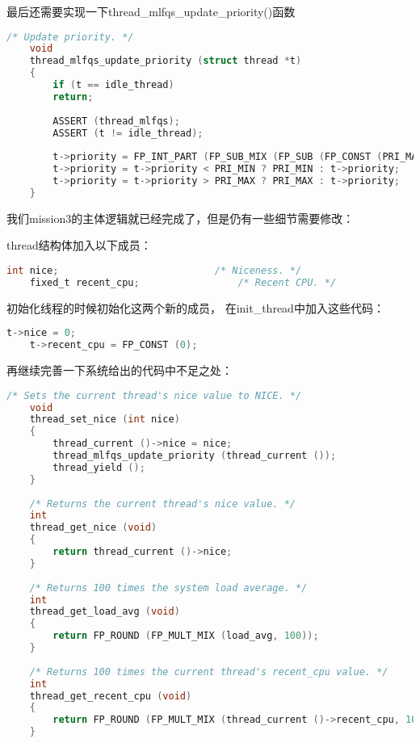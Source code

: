 \documentclass{article}
\begin{document}
	最后还需要实现一下thread\_mlfqs\_update\_priority()函数
	
	\begin{lstlisting}[language=C, title=thread\_mlfqs\_update\_priority()函数]
	/* Update priority. */
    void
    thread_mlfqs_update_priority (struct thread *t)
    {
    	if (t == idle_thread)
    	return;
    	
    	ASSERT (thread_mlfqs);
    	ASSERT (t != idle_thread);
    	
    	t->priority = FP_INT_PART (FP_SUB_MIX (FP_SUB (FP_CONST (PRI_MAX), FP_DIV_MIX (t->recent_cpu, 4)), 2 * t->nice));
    	t->priority = t->priority < PRI_MIN ? PRI_MIN : t->priority;
    	t->priority = t->priority > PRI_MAX ? PRI_MAX : t->priority;
    }
	\end{lstlisting}
	
	我们mission3的主体逻辑就已经完成了，但是仍有一些细节需要修改：
	
	thread结构体加入以下成员：
	
	\begin{lstlisting}[language=C, title=thread结构体加入新变量]
    int nice;                           /* Niceness. */
    fixed_t recent_cpu;                 /* Recent CPU. */
	\end{lstlisting}
	
	初始化线程的时候初始化这两个新的成员， 在init\_thread中加入这些代码：
	
	\begin{lstlisting}[language=C, title=init\_thread结构体加入新代码]
    t->nice = 0;
    t->recent_cpu = FP_CONST (0);
	\end{lstlisting}
	
	再继续完善一下系统给出的代码中不足之处：
	
	\begin{lstlisting}[language=C, title=仍然需要修改的四个函数]
	/* Sets the current thread's nice value to NICE. */
    void
    thread_set_nice (int nice)
    {
    	thread_current ()->nice = nice;
    	thread_mlfqs_update_priority (thread_current ());
    	thread_yield ();
    }
    
    /* Returns the current thread's nice value. */
    int
    thread_get_nice (void)
    {
    	return thread_current ()->nice;
    }
    
    /* Returns 100 times the system load average. */
    int
    thread_get_load_avg (void)
    {
    	return FP_ROUND (FP_MULT_MIX (load_avg, 100));
    }
    
    /* Returns 100 times the current thread's recent_cpu value. */
    int
    thread_get_recent_cpu (void)
    {
    	return FP_ROUND (FP_MULT_MIX (thread_current ()->recent_cpu, 100));
    }
	\end{lstlisting}
	
\end{document}
